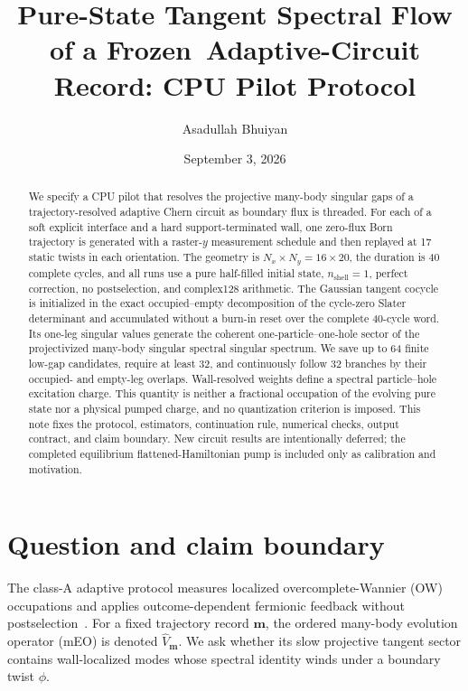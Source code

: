 \documentclass[aps,prb,twocolumn,floatfix,nofootinbib,superscriptaddress]{revtex4-2}
\begin{document}
\title{Pure-State Tangent Spectral Flow of a Frozen\
Adaptive-Circuit Record: CPU Pilot Protocol}
\author{Asadullah Bhuiyan}
\date{September 3, 2026}

\begin{abstract}
We specify a CPU pilot that resolves the projective many-body singular gaps of
a trajectory-resolved adaptive Chern circuit as boundary flux is threaded.
For each of a soft explicit interface and a hard support-terminated wall, one
zero-flux Born trajectory is generated with a raster-$y$ measurement schedule
and then replayed at 17 static twists in each orientation.  The geometry is
$N_x\times N_y=16\times20$, the duration is 40 complete cycles, and all runs
use a pure half-filled initial state, $n_{\mathrm{shell}}=1$, perfect
correction, no postselection, and complex128 arithmetic.  The Gaussian
tangent cocycle is initialized in the exact occupied--empty decomposition of
the cycle-zero Slater determinant and accumulated without a burn-in reset over
the complete 40-cycle word.  Its one-leg singular values generate the
coherent one-particle--one-hole sector of the projectivized many-body singular
spectral singular spectrum.  We save up to 64 finite low-gap candidates,
require at least 32, and continuously follow 32 branches by their occupied-
and empty-leg overlaps.  Wall-resolved weights define a
spectral particle--hole excitation charge.  This quantity is neither a
fractional occupation of the evolving pure state nor a physical pumped charge,
and no quantization criterion is imposed.  This note fixes the protocol,
estimators, continuation rule, numerical checks, output contract, and claim
boundary.  New circuit results are intentionally deferred; the completed
equilibrium flattened-Hamiltonian pump is included only as calibration and
motivation.
\end{abstract}

\maketitle

\section{Question and claim boundary}

The class-A adaptive protocol measures localized overcomplete-Wannier (OW)
occupations and applies outcome-dependent fermionic feedback without
postselection~\cite{BhuiyanPanJian2026}.  For a fixed trajectory record
$\boldsymbol m$, the ordered many-body evolution operator (mEO) is denoted
$\hat V_{\boldsymbol m}$.  We ask whether its slow projective tangent sector
contains wall-localized modes whose spectral identity winds under a boundary
twist $\phi$.
\end{document}
